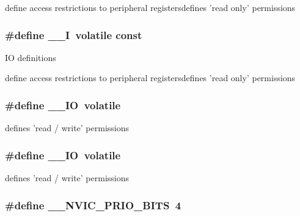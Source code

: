 define access restrictions to peripheral registersdefines 'read only' permissions \hypertarget{group___c_m_s_i_s___c_m3__core__definitions_gaf63697ed9952cc71e1225efe205f6cd3}{
\subsubsection[{\-\_\-\-\_\-\-I}]{\setlength{\rightskip}{0pt plus 5cm}\#define \-\_\-\-\_\-\-I~volatile const}}\label{group___c_m_s_i_s___c_m3__core__definitions_gaf63697ed9952cc71e1225efe205f6cd3}
I\-O definitions

define access restrictions to peripheral registersdefines 'read only' permissions \hypertarget{group___c_m_s_i_s___c_m3__core__definitions_gaec43007d9998a0a0e01faede4133d6be}{
\subsubsection[{\-\_\-\-\_\-\-I\-O}]{\setlength{\rightskip}{0pt plus 5cm}\#define \-\_\-\-\_\-\-I\-O~volatile}}\label{group___c_m_s_i_s___c_m3__core__definitions_gaec43007d9998a0a0e01faede4133d6be}
defines 'read / write' permissions \hypertarget{group___c_m_s_i_s___c_m3__core__definitions_gaec43007d9998a0a0e01faede4133d6be}{
\subsubsection[{\-\_\-\-\_\-\-I\-O}]{\setlength{\rightskip}{0pt plus 5cm}\#define \-\_\-\-\_\-\-I\-O~volatile}}\label{group___c_m_s_i_s___c_m3__core__definitions_gaec43007d9998a0a0e01faede4133d6be}
defines 'read / write' permissions \hypertarget{group___c_m_s_i_s___c_m3__core__definitions_gae3fe3587d5100c787e02102ce3944460}{
\subsubsection[{\-\_\-\-\_\-\-N\-V\-I\-C\-\_\-\-P\-R\-I\-O\-\_\-\-B\-I\-T\-S}]{\setlength{\rightskip}{0pt plus 5cm}\#define \-\_\-\-\_\-\-N\-V\-I\-C\-\_\-\-P\-R\-I\-O\-\_\-\-B\-I\-T\-S~4}}\label{group___c_m_s_i_s___c_m3__core__definitions_gae3fe3587d5100c787e02102ce3944460}

